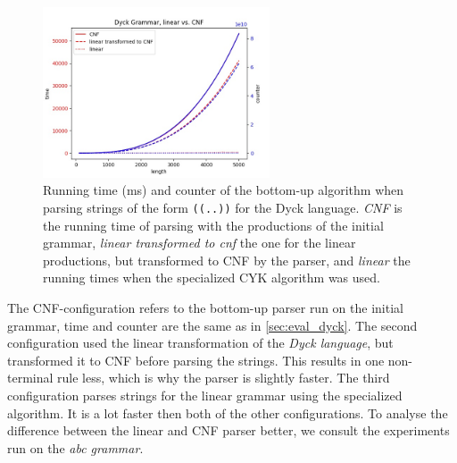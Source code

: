 \begin{figure}[!ht]
    \centering
    \includegraphics[width=0.6\textwidth]{Resources/t_c_dyck_lin_cnf.jpg}
    \caption{Running time (ms) and counter of the bottom-up algorithm when parsing strings of the form \texttt{((..))} for the Dyck language. \textit{CNF} is the running time of parsing with the productions of the initial grammar, \textit{linear transformed to cnf} the one for the linear productions, but transformed to CNF by the parser, and \textit{linear} the running times when the specialized CYK algorithm was used.}
    \label{fig:t_c_dyck_lin_cnf}
\end{figure}

The CNF-configuration refers to the bottom-up parser run on the initial grammar, time and counter are the same as in \ref{sec:eval_dyck}.
The second configuration used the linear transformation of the \textit{Dyck language}, but transformed it to CNF before parsing the strings.
This results in one non-terminal rule less, which is why the parser is slightly faster.
The third configuration parses strings for the linear grammar using the specialized algorithm.
It is a lot faster then both of the other configurations.
To analyse the difference between the linear and CNF parser better, we consult the experiments run on the \textit{abc grammar}.


